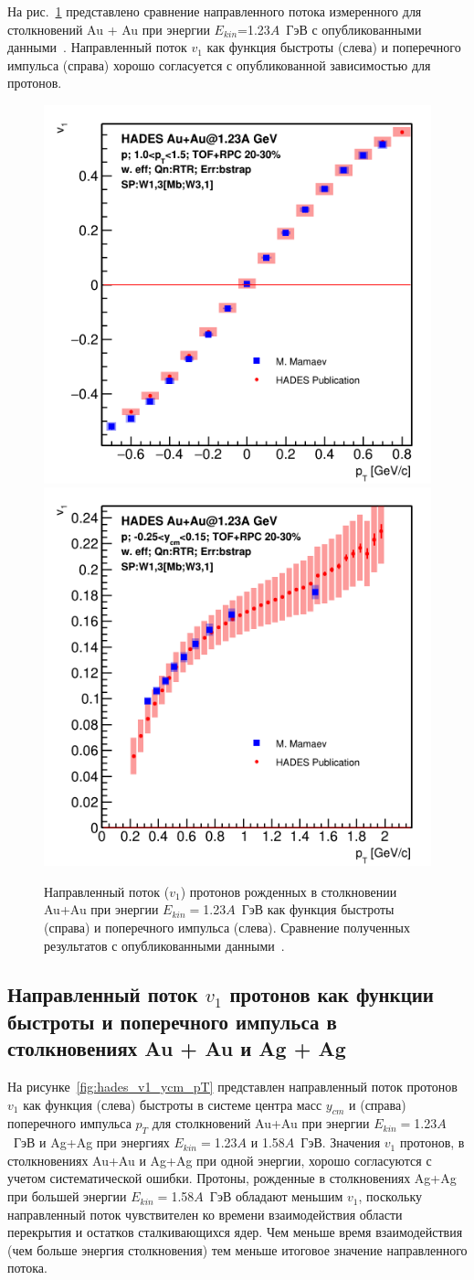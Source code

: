 На рис.~\ref{fig:hades_v1_publ_comparison} представлено сравнение направленного потока измеренного для столкновений Au + Au при энергии $E_{kin}$=1.23$A$~ГэВ с опубликованными данными~\cite{HADES:2020lob}.
Направленный поток $v_1$ как функция быстроты (слева) и поперечного импульса (справа) хорошо согласуется с опубликованной зависимостью для протонов.
%
\begin{figure}[ht]
\begin{center}
\includegraphics[width=0.45\linewidth]{images/v1_au123_publication_ycm.png}
\includegraphics[width=0.45\linewidth]{images/v1_au123_publication_pT.png}
\caption{Направленный поток ($v_1$) протонов  рожденных в столкновении Au+Au при энергии $E_{kin}=$1.23$A$~ГэВ как функция быстроты (справа) и поперечного импульса (слева). Сравнение полученных результатов с опубликованными данными~\cite{HADES:2020lob}. }
\label{fig:hades_v1_publ_comparison}
\end{center}
\end{figure}

\subsection{Направленный поток $v_1$ протонов как функции быстроты и поперечного импульса в столкновениях Au + Au и Ag + Ag}

На рисунке~\ref{fig:hades_v1_ycm_pT} представлен направленный поток протонов $v_1$ как функция (слева) быстроты в системе центра масс $y_{cm}$ и (справа) поперечного импульса $p_T$ для столкновений Au+Au при энергии $E_{kin}=$1.23$A$~ГэВ и Ag+Ag при энергиях $E_{kin}=$1.23$A$ и 1.58$A$~ГэВ.
Значения $v_1$ протонов, в столкновениях Au+Au и Ag+Ag при одной энергии, хорошо согласуются с учетом систематической ошибки. 
Протоны, рожденные в столкновениях Ag+Ag при большей энергии $E_{kin}=$1.58$A$~ГэВ обладают меньшим $v_1$, поскольку направленный поток чувствителен ко времени взаимодействия области перекрытия и остатков сталкивающихся ядер.
Чем меньше время взаимодействия (чем больше энергия столкновения) тем меньше итоговое значение направленного потока.

